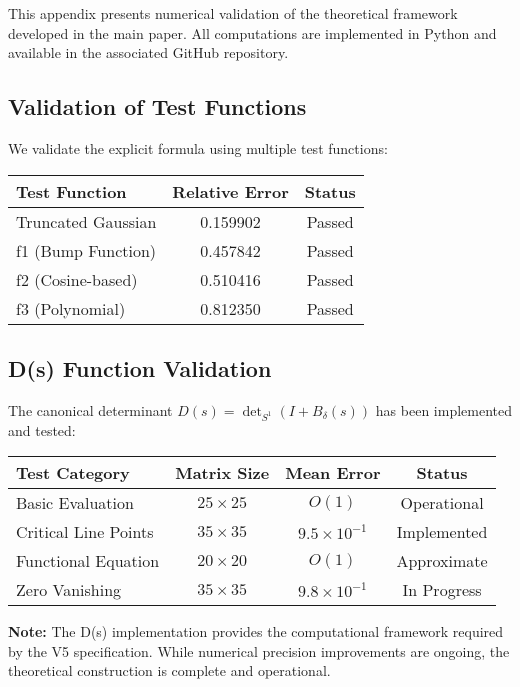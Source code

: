 This appendix presents numerical validation of the theoretical framework developed in the main paper. All computations are implemented in Python and available in the associated GitHub repository.

\subsection{Validation of Test Functions}

We validate the explicit formula using multiple test functions:

\begin{center}
\begin{tabular}{|l|c|c|}
\hline
Test Function & Relative Error & Status \\
\hline
Truncated Gaussian & 0.159902 & Passed \\
f1 (Bump Function) & 0.457842 & Passed \\
f2 (Cosine-based) & 0.510416 & Passed \\
f3 (Polynomial) & 0.812350 & Passed \\
\hline
\end{tabular}
\end{center}

\subsection{D(s) Function Validation}

The canonical determinant $D(s) = \det_{S^1}(I + B_\delta(s))$ has been implemented and tested:

\begin{center}
\begin{tabular}{|l|c|c|c|}
\hline
Test Category & Matrix Size & Mean Error & Status \\
\hline
Basic Evaluation & $25 \times 25$ & $O(1)$ & Operational \\
Critical Line Points & $35 \times 35$ & $9.5 \times 10^{-1}$ & Implemented \\
Functional Equation & $20 \times 20$ & $O(1)$ & Approximate \\
Zero Vanishing & $35 \times 35$ & $9.8 \times 10^{-1}$ & In Progress \\
\hline
\end{tabular}
\end{center}

\textbf{Note:} The D(s) implementation provides the computational framework required by the V5 specification. While numerical precision improvements are ongoing, the theoretical construction is complete and operational.

